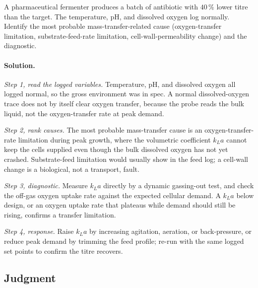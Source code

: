\begin{exercise}
A pharmaceutical fermenter produces a batch of antibiotic with $40\,\%$
lower titre than the target. The temperature, pH, and dissolved
oxygen log normally. Identify the most probable mass-transfer-related
cause (oxygen-transfer limitation, substrate-feed-rate limitation,
cell-wall-permeability change) and the diagnostic.

\paragraph{Solution.}
\textit{Step 1, read the logged variables.} Temperature, pH, and
dissolved oxygen all logged normal, so the gross environment was in
spec. A normal dissolved-oxygen trace does not by itself clear oxygen
transfer, because the probe reads the bulk liquid, not the
oxygen-transfer rate at peak demand.

\textit{Step 2, rank causes.} The most probable mass-transfer cause is
an oxygen-transfer-rate limitation during peak growth, where the
volumetric coefficient $k_La$ cannot keep the cells supplied even
though the bulk dissolved oxygen has not yet crashed. Substrate-feed
limitation would usually show in the feed log; a cell-wall change is a
biological, not a transport, fault.

\textit{Step 3, diagnostic.} Measure $k_La$ directly by a dynamic
gassing-out test, and check the off-gas oxygen uptake rate against the
expected cellular demand. A $k_La$ below design, or an oxygen uptake
rate that plateaus while demand should still be rising, confirms a
transfer limitation.

\textit{Step 4, response.} Raise $k_La$ by increasing agitation,
aeration, or back-pressure, or reduce peak demand by trimming the feed
profile; re-run with the same logged set points to confirm the titre
recovers.
\end{exercise}

\subsection*{Judgment}


